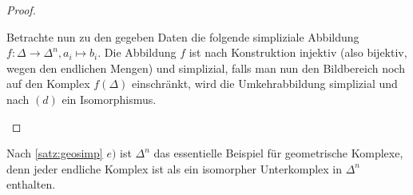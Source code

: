 \begin{Satz}
\begin{proof}
\begin{enumerate}[(a)]
            Betrachte nun zu den gegeben Daten die folgende
            simpliziale Abbildung
            $f : \Delta \rightarrow \Delta^n , a_i \mapsto b_i$.  Die
            Abbildung $f$ ist nach Konstruktion injektiv (also
            bijektiv, wegen den endlichen Mengen) und simplizial,
            falls man nun den Bildbereich noch auf den Komplex
            $f(\Delta)$ einschränkt, wird die Umkehrabbildung
            simplizial und nach $(d)$ ein Isomorphismus.
          \end{enumerate}
	\end{proof}
\end{Satz}

\begin{Bem}
  Nach \cref{satz:geosimp} $e)$ ist $\Delta^n$ das essentielle
  Beispiel für geometrische Komplexe, denn jeder endliche Komplex ist
  als ein isomorpher Unterkomplex in $\Delta^n$ enthalten.
\end{Bem}














